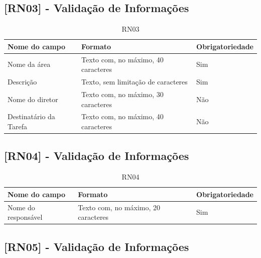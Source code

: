 \begin{apendicesenv}
\subsection{[RN03] - Validação de Informações}

\begin{table}[!h]
\centering
\caption{RN03}
\label{RN03}
\begin{tabular}{|p{4cm}|p{8cm}|p{3cm}|}
\hline
Nome do campo          & Formato                             & Obrigatoriedade \\ \hline
Nome da área           & Texto com, no máximo, 40 caracteres & Sim             \\ \hline
Descrição              & Texto, sem limitação de caracteres  & Sim             \\ \hline
Nome do diretor        & Texto com, no máximo, 30 caracteres & Não             \\ \hline
Destinatário da Tarefa & Texto com, no máximo, 40 caracteres & Não             \\ \hline
\end{tabular}
\end{table}


\subsection{[RN04] - Validação de Informações}

\begin{table}[!h]
\centering
\caption{RN04}
\label{RN04}
\begin{tabular}{|p{4cm}|p{8cm}|p{3cm}|}
\hline
Nome do campo          & Formato                             & Obrigatoriedade \\ \hline
Nome do responsável    & Texto com, no máximo, 20 caracteres & Sim             \\ \hline
\end{tabular}
\end{table}


\subsection{[RN05] - Validação de Informações}


\end{apendicesenv}
